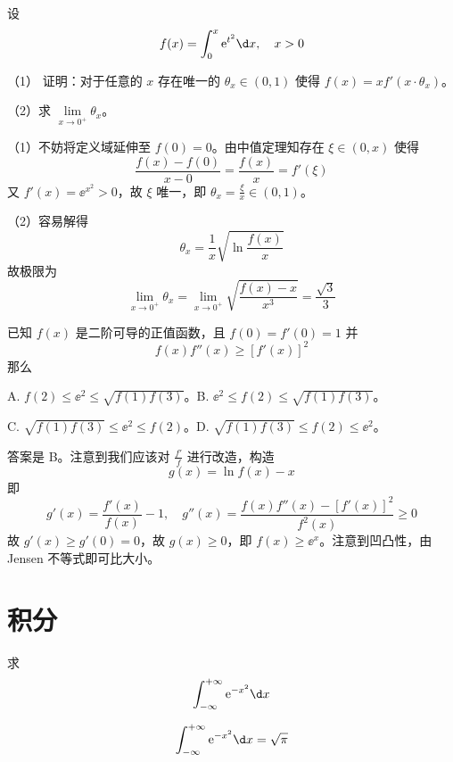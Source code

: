 \begin{problem}[000025]
设
\[ f(x) = \int_{0}^{x} \ee^{t^2} \d x, \quad x > 0 \]

（1） 证明：对于任意的 $x$ 存在唯一的 $\theta_x \in (0, 1)$ 使得 $f(x) = x f'(x \cdot \theta_x)$。

（2）求 $\lim\limits_{x \to 0^+} \theta_x$。
\end{problem}

\begin{solution}
	（1）不妨将定义域延伸至 $f(0) = 0$。由中值定理知存在 $\xi \in (0, x)$ 使得
	\[ \frac{f(x) - f(0)}{x - 0} = \frac{f(x)}{x} = f'(\xi) \]
	又 $f'(x) = \ee^{x^2} > 0$，故 $\xi$ 唯一，即 $\theta_x = \frac{\xi}{x} \in (0, 1)$。

	（2）容易解得
	\[ \theta_x = \frac{1}{x} \sqrt{\ln \frac{f(x)}{x}} \]
	故极限为
	\[ \lim_{x \to 0^+} \theta_x = \lim_{x \to 0^+} \sqrt{\frac{f(x) - x}{x^3}} = \frac{\sqrt{3}}{3} \]
\end{solution}

\begin{problem}[000026]
已知 $f(x)$ 是二阶可导的正值函数，且 $f(0) = f'(0) = 1$ 并
\[ f(x) f''(x) \geqslant [f'(x)]^2 \]
那么

A. $f(2) \leqslant \ee^2 \leqslant \sqrt{f(1)f(3)}$。B. $\ee^2 \leqslant f(2) \leqslant \sqrt{f(1)f(3)}$。

C. $\sqrt{f(1)f(3)} \leqslant \ee^2 \leqslant f(2)$。D. $\sqrt{f(1)f(3)} \leqslant f(2) \leqslant \ee^2$。
\end{problem}

\begin{solution}
	答案是 B。注意到我们应该对 $\frac{f'}{f}$ 进行改造，构造
	\[ g(x) = \ln f(x) - x \]
	即
	\[ g'(x) = \frac{f'(x)}{f(x)} - 1, \quad g''(x) = \frac{f(x) f''(x) - [f'(x)]^2}{f^2(x)} \geqslant 0 \]
	故 $g'(x) \geqslant g'(0) = 0$，故 $g(x) \geqslant 0$，即 $f(x) \geqslant \ee^x$。注意到凹凸性，由 Jensen 不等式即可比大小。
\end{solution}


\section{积分}

\begin{problem}[000008]
求
\[ \int_{-\infty}^{+\infty} \ee^{-x^2}\d x \]
\end{problem}
\begin{solution}
	\[ \int_{-\infty}^{+\infty} \ee^{-x^2}\d x = \sqrt{\pi} \]
\end{solution}

